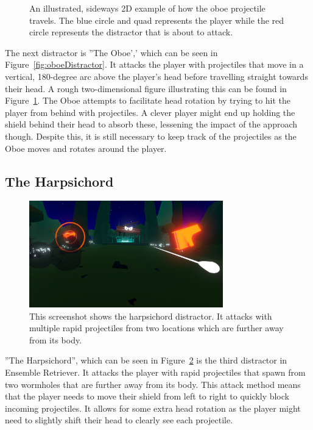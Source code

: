 \begin{figure}[htbp]
  \centering
  
  \caption[Sideways 2D Example of Oboe Projectile Path]{An illustrated, sideways 2D example of how the oboe projectile travels. The blue circle and quad represents the player while the red circle represents the distractor that is about to attack.}
  \label{fig:oboeProjectile}
\end{figure}
The next distractor is ''The Oboe',' which can be seen in Figure~\ref{fig:oboeDistractor}. It attacks the player with projectiles that move in a vertical, 180-degree arc above the player's head before travelling straight towards their head. A rough two-dimensional figure illustrating this can be found in Figure~\ref{fig:oboeProjectile}. The Oboe attempts to facilitate head rotation by trying to hit the player from behind with projectiles. A clever player might end up holding the shield behind their head to absorb these, lessening the impact of the approach though. Despite this, it is still necessary to keep track of the projectiles as the Oboe moves and rotates around the player. 

\subsection{The Harpsichord}
\begin{figure}[tbph]
    \centering
    \includegraphics[width=0.75\textwidth]{figures/screenshots/harpsichord.png}
    \caption[The Harpsichord Distractor]{This screenshot shows the harpsichord distractor. It attacks with multiple rapid projectiles from two locations which are further away from its body.}
    \label{fig:harpsichordDistractor}
\end{figure}
''The Harpsichord'', which can be seen in Figure~\ref{fig:harpsichordDistractor} is the third distractor in Ensemble Retriever. It attacks the player with rapid projectiles that spawn from two wormholes that are further away from its body. This attack method means that the player needs to move their shield from left to right to quickly block incoming projectiles. It allows for some extra head rotation as the player might need to slightly shift their head to clearly see each projectile. 

